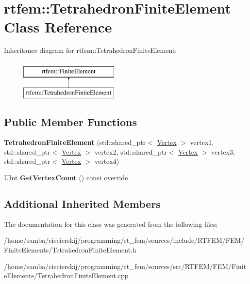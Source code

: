 \hypertarget{classrtfem_1_1TetrahedronFiniteElement}{}\section{rtfem\+:\+:Tetrahedron\+Finite\+Element Class Reference}
\label{classrtfem_1_1TetrahedronFiniteElement}
Inheritance diagram for rtfem\+:\+:Tetrahedron\+Finite\+Element\+:\begin{figure}[H]
\begin{center}
\leavevmode
\includegraphics[height=2.000000cm]{classrtfem_1_1TetrahedronFiniteElement}
\end{center}
\end{figure}
\subsection*{Public Member Functions}
\begin{DoxyCompactItemize}
\item 
\mbox{\label{classrtfem_1_1TetrahedronFiniteElement_a0f0d0a29e70d89424db4dfdb5dd6bb76}} 
{\bfseries Tetrahedron\+Finite\+Element} (std\+::shared\+\_\+ptr$<$ \hyperlink{classrtfem_1_1Vertex}{Vertex} $>$ vertex1, std\+::shared\+\_\+ptr$<$ \hyperlink{classrtfem_1_1Vertex}{Vertex} $>$ vertex2, std\+::shared\+\_\+ptr$<$ \hyperlink{classrtfem_1_1Vertex}{Vertex} $>$ vertex3, std\+::shared\+\_\+ptr$<$ \hyperlink{classrtfem_1_1Vertex}{Vertex} $>$ vertex4)
\item 
\mbox{\label{classrtfem_1_1TetrahedronFiniteElement_adb2b8513f18dd6b24a63893e9f930ced}} 
U\+Int {\bfseries Get\+Vertex\+Count} () const override
\end{DoxyCompactItemize}
\subsection*{Additional Inherited Members}


The documentation for this class was generated from the following files\+:\begin{DoxyCompactItemize}
\item 
/home/samba/ciecierskij/programming/rt\+\_\+fem/sources/include/\+R\+T\+F\+E\+M/\+F\+E\+M/\+Finite\+Elements/Tetrahedron\+Finite\+Element.\+h\item 
/home/samba/ciecierskij/programming/rt\+\_\+fem/sources/src/\+R\+T\+F\+E\+M/\+F\+E\+M/\+Finite\+Elements/Tetrahedron\+Finite\+Element.\+cpp\end{DoxyCompactItemize}
